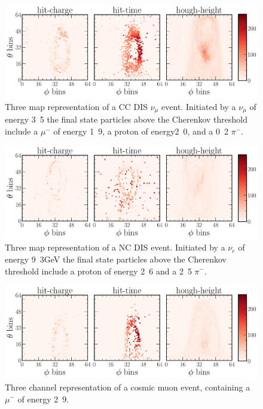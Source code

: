 \begin{figure} %
    \includegraphics[width=\textwidth]{diagrams/7-results/explore_numu_ccdis_event.pdf}
    \caption[Example of a CC DIS $\nu_{\mu}$ event]
    {Three map representation of a CC DIS $\nu_{\mu}$ event. Initiated by a $\nu_{\mu}$ of energy
        \unit{3.5}{\GeV} the final state particles above the Cherenkov threshold include a
        $\mu^{-}$ of energy \unit{1.9}{\GeV}, a proton of energy\unit{2.0}{\GeV}, and a
        \unit{0.2}{\GeV} $\pi^{-}$.}
    \label{fig:explore_numu_ccdis_event}
\end{figure}

\begin{figure} %
    \includegraphics[width=\textwidth]{diagrams/7-results/explore_nuel_ncdis_event.pdf}
    \caption[Example of a NC DIS event]
    {Three map representation of a NC DIS event. Initiated by a $\nu_{e}$ of energy
        \unit{9.3}{GeV} the final state particles above the Cherenkov threshold include a proton
        of energy \unit{2.6}{\GeV} and a \unit{2.5}{\GeV} $\pi^{-}$.}
    \label{fig:explore_nuel_ncdis_event}
\end{figure}

\begin{figure} %
    \includegraphics[width=\textwidth]{diagrams/7-results/explore_cosmic_event.pdf}
    \caption[Example of a cosmic muon event]
    {Three channel representation of a cosmic muon event, containing a $\mu^{-}$ of energy
        \unit{2.9}{\GeV}.}
    \label{fig:explore_cosmic_event}
\end{figure}

